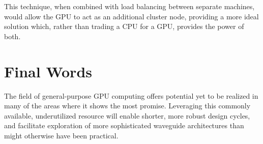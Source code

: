 This technique, when combined with load balancing between separate machines, would allow the GPU to act as an additional cluster node, providing a more ideal solution which, rather than trading a CPU for a GPU, provides the power of both. 


\section{Final Words}

The field of general-purpose GPU computing offers potential yet to be realized in many of the areas where it shows the most promise. Leveraging this commonly available, underutilized resource will enable shorter, more robust design cycles, and facilitate exploration of more sophisticated waveguide architectures than might otherwise have been practical. 




